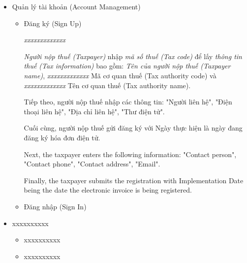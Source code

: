 \begin{itemize}

\item Quản lý tài khoản (Account Management)

\begin{itemize}

\item Đăng ký (Sign Up)

\emph{xxxxxxxxxxxxx}

\emph{Người nộp thuế (Taxpayer)} nhập \emph{mã số thuế (Tax code)} để lấy \emph{thông tin thuế (Tax information)} bao gồm: \emph{Tên của người nộp thuế (Taxpayer name)}, \emph{xxxxxxxxxxxxx} Mã cơ quan thuế (Tax authority code) và \emph{xxxxxxxxxxxxx} Tên cơ quan thuế (Tax authority name).

Tiếp theo, người nộp thuế nhập các thông tin: "Người liên hệ", "Điện thoại liên hệ", "Địa chỉ liên hệ", "Thư điện tử".

Cuối cùng, người nộp thuế gửi đăng ký với Ngày thực hiện là ngày đang đăng ký hóa đơn điện tử.

Next, the taxpayer enters the following information: "Contact person", "Contact phone", "Contact address", "Email".

Finally, the taxpayer submits the registration with Implementation Date being the date the electronic invoice is being registered.

\item Đăng nhập (Sign In)


\end{itemize}

\item xxxxxxxxxx

\begin{itemize}

\item xxxxxxxxxx

\item xxxxxxxxxx

\end{itemize}

\end{itemize}



